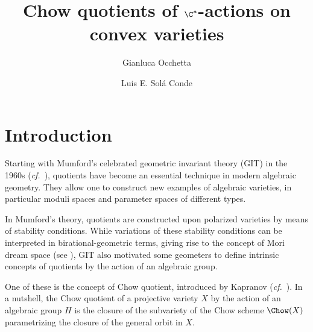 \documentclass[11pt]{amsart}
\title{Chow quotients of $\boldsymbol{\C^*}$-actions on convex varieties}
\author{Gianluca Occhetta}
\author{Luis E. Sol\'a Conde}
\numberwithin{equation}{section}
\theoremstyle{definition}
\theoremstyle{remark}
\begin{document}


\maketitle


\begin{prelims}

\DisplayAbstractInEnglish

\bigskip

\DisplayKeyWords

\medskip

\DisplayMSCclass

\end{prelims}



\newpage

\setcounter{tocdepth}{1}

\tableofcontents




\section{Introduction}\label{sec:intro}


Starting with Mumford's celebrated geometric invariant theory (GIT) in the 1960s (\textit{cf.}~\cite{MFK}), quotients have become an essential technique in modern algebraic geometry. They allow one to construct new examples of algebraic varieties, in particular moduli spaces and parameter spaces of different types.

In Mumford's theory, quotients are constructed upon  polarized varieties by means of stability conditions. While variations of these stability conditions can be interpreted in birational-geometric terms, giving rise to the concept of Mori dream space (see \cite{Thaddeus1996,HuKeel}), GIT also motivated some geometers to define intrinsic concepts of quotients by the action of an algebraic group.

One of these is the concept of Chow quotient, introduced by  
Kapranov (\textit{cf.}~\cite{Kap}). In a nutshell, the Chow quotient of a projective variety $X$ by the action of an algebraic group $H$  is the closure of the subvariety of the Chow scheme $\Chow(X)$ parametrizing the closure of the general orbit in $X$.
\end{document}
